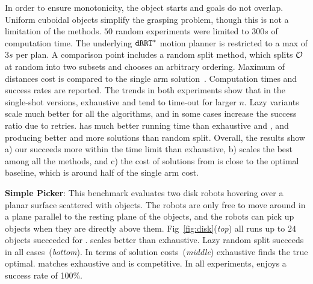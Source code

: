 In order to ensure monotonicity, the object starts and goals do not overlap. Uniform cuboidal objects simplify the grasping problem, though this is not a limitation of the methods. $ 50 $ random experiments were limited to $300s$ of computation time. The underlying $ {\tt dRRT^*} $ motion planner is restricted to a max of $ 3s $ per plan.
A comparison point includes a random split method, which splits $ \mathcal{O} $ at random into two subsets and chooses an arbitrary ordering. Maximum of distances cost is compared to the single arm solution~\cite{193}. Computation times and success rates are reported. The trends in both experiments show that in the single-shot versions, exhaustive and \milp tend to time-out for larger $n$. Lazy variants scale much better for all the algorithms, and in some cases increase the success ratio due to retries. \algo has much better running time than exhaustive and \milp, and producing better and more solutions than random split. Overall, the results show a) our \milp succeeds more within the time limit than exhaustive, b) \algo scales the best among all the methods, and c) the cost of solutions from \algo is close to the optimal baseline, which is around half of the single arm cost.

\textbf{Simple Picker}: This benchmark evaluates two disk robots hovering over a planar surface scattered with objects. The robots are only free to move around in a plane parallel to the resting plane of the objects, and the robots can pick up objects when they are directly above them. Fig~\ref{fig:disk}(\textit{top}) all runs up to $ 24 $ objects succeeded for \algo. \milp scales better than exhaustive. Lazy random split succeeds in all cases~(\textit{bottom}). In terms of solution costs~(\textit{middle}) exhaustive finds the true optimal. \milp matches exhaustive and \algo is competitive. In all experiments, \algo enjoys a success rate of 100\%.

